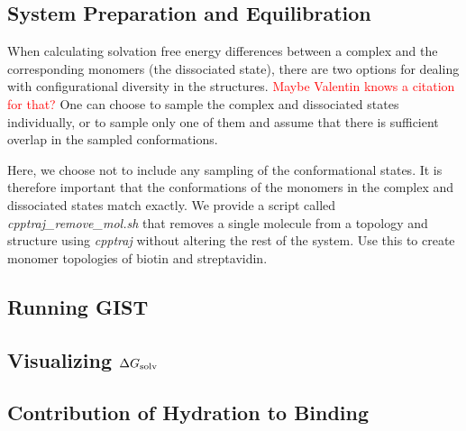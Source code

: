 \documentclass[9pt,tutorial]{livecoms}
\newcommand{\dgsolv}{\Delta G_\textup{solv}}
\newcommand{\software}{\emph}
\newcommand{\todo}{\textcolor{red}}
\begin{document}
\subsection{System Preparation and Equilibration}
When calculating solvation free energy differences between a complex and the corresponding monomers (the dissociated state), there are two options for dealing with configurational diversity in the structures.
\todo{Maybe Valentin knows a citation for that?}
One can choose to sample the complex and dissociated states individually, or to sample only one of them and assume that there is sufficient overlap in the sampled conformations.

Here, we choose not to include any sampling of the conformational states. It is therefore important that the conformations of the monomers in the complex and dissociated states match exactly. We provide a script called \software{cpptraj\_remove\_mol.sh} that removes a single molecule from a topology and structure using \software{cpptraj} without altering the rest of the system. Use this to create monomer topologies of biotin and streptavidin.


\subsection{Running GIST}
\subsection{Visualizing $\dgsolv$}
\subsection{Contribution of Hydration to Binding}
\end{document}
